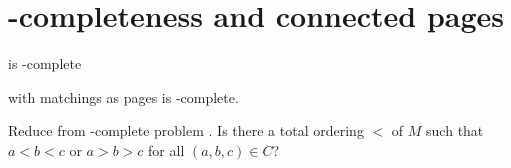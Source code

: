 
\section{\NP-completeness and connected pages}

\begin{frame}{\probBook is \NP-complete}

\begin{theorem}
\probBook with matchings as pages is \NP-complete.
\end{theorem}

Reduce from \NP-complete problem \probBetween [Opatrny, 1979].
{Is there a total ordering $<$ of $M$ such that $a < b < c$ or $a > b > c$ for all $(a, b, c) \in C$?}
\end{frame}

